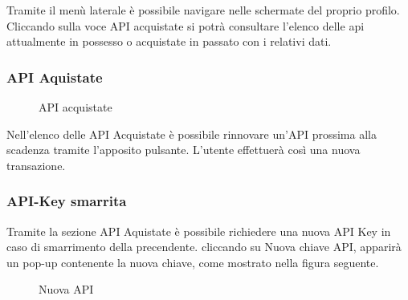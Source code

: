 Tramite il menù laterale è possibile navigare nelle schermate del proprio profilo. Cliccando sulla voce API acquistate si potrà consultare l'elenco delle api attualmente in possesso o acquistate in passato con i relativi dati. 

\subsubsection{API Aquistate}
\label{API acquistate}
\begin{figure}[H]
	\centering
	\caption{API acquistate}
\end{figure}
Nell'elenco delle API Acquistate è possibile rinnovare un'API prossima alla scadenza tramite l'apposito pulsante. L'utente effettuerà così una nuova transazione.
\subsubsection{API-Key smarrita}
Tramite la sezione API Aquistate è possibile richiedere una nuova API Key in caso di smarrimento della precendente. cliccando su Nuova chiave API, apparirà un pop-up contenente la nuova chiave, come mostrato nella figura seguente.

\label{Nuova API}
\begin{figure}[H]
	\centering
	\caption{Nuova API}
\end{figure}

